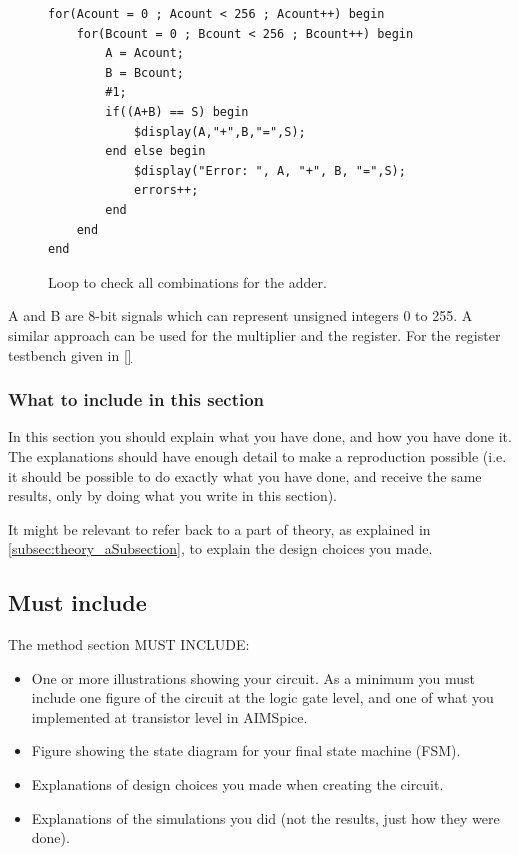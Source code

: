 \begin{figure}[H]
\centering
\caption{Loop to check all combinations for the adder.}
\label{fig:verilog_adderTB_excerpt}
\begin{minipage}{0.8\textwidth}
\begin{lstlisting}[style=verilogStyle]
for(Acount = 0 ; Acount < 256 ; Acount++) begin
    for(Bcount = 0 ; Bcount < 256 ; Bcount++) begin
        A = Acount;
        B = Bcount;
        #1;
        if((A+B) == S) begin
            $display(A,"+",B,"=",S);
        end else begin
            $display("Error: ", A, "+", B, "=",S);
            errors++;
        end
    end
end
\end{lstlisting}
\end{minipage}
\end{figure}

A and B are 8-bit signals which can represent unsigned integers 0 to 255. A similar approach can be used for the multiplier and the register. For the register testbench given in \autoref{}


\subsubsection{What to include in this section}

In this section you should explain what you have done, and how you have done it. The explanations should have enough detail to make a reproduction possible (i.e. it should be possible to do exactly what you have done, and receive the same results, only by doing what you write in this section).


It might be relevant to refer back to a part of theory, as explained in \autoref{subsec:theory_aSubsection}, to explain the design choices you made.

\subsection{Must include}
The method section MUST INCLUDE:
\begin{itemize}
    \item One or more illustrations showing your circuit. As a minimum you must include one figure of the circuit at the logic gate level, and one of what you implemented at transistor level in AIMSpice.
    \item Figure showing the state diagram for your final state machine (FSM).
    \item Explanations of design choices you made when creating the circuit.
    \item Explanations of the simulations you did (not the results, just how they were done).
\end{itemize}